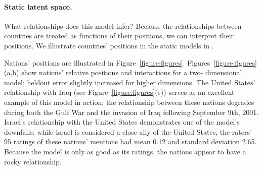 \paragraph{Static latent space.}
What relationships does this model infer?  Because the relationships
between countries are treated as functions of their positions, we can
interpret their positions.  We illustrate countries' positions in the
static models in \myfig{}.

Nations' positions are illustrated in Figure~\ref{figure:figures}.
Figures~\ref{figure:figures}(a,b) show nations' relative positions
and interactions for a two- dimensional model; heldout error slightly
increased for higher dimensions. The United States' relationship with
Iraq (see Figure~\ref{figure:figures}(c)) serves as an excellent
example of this model in action; the relationship between these
nations degrades during both the Gulf War and the invasion of Iraq
following September 9th, 2001.  Israel's relationship with the United
States demonstrates one of the model's downfalls: while Israel is
considered a close ally of the United States, the raters' 95 ratings
of these nations' mentions had mean 0.12 and standard deviation
2.65.  Because the model is only as good as its ratings, the nations
appear to have a rocky relationship.







